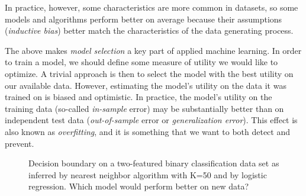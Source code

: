 \begin{refsection}
In practice, however, some characteristics are more common in datasets, so some models and algorithms perform better on average because their assumptions ({\em inductive bias}) better match the characteristics of the data generating process.

The above makes {\em model selection} a key part of applied machine learning. In order to train a model, we should define some measure of utility we would like to optimize. A trivial approach is then to select the model with the best utility on our available data. However, estimating the model's utility on the data it was trained on is biased and optimistic. In practice, the model's utility on the training data (so-called {\em in-sample} error) may be substantially better than on independent test data ({\em out-of-sample} error or {\em generalization error}). This effect is also known as {\em overfitting}, and it is something that we want to both detect and prevent.

\begin{figure}
\caption{Decision boundary on a two-featured binary classification data set as inferred by nearest neighbor algorithm with K=50 and by logistic regression. Which model would perform better on new data?}
\label{fig:1-nn}
\end{figure}


\end{refsection}
